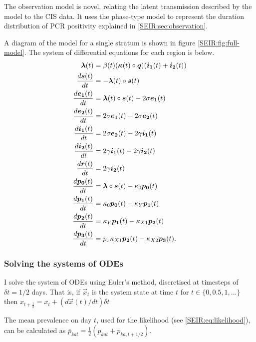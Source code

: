 \documentclass[thesis.tex]{subfiles}
\begin{document}
The observation model is novel, relating the latent transmission described by the model to the CIS data.
It uses the phase-type model to represent the duration distribution of PCR positivity explained in \cref{SEIR:sec:observation}.

A diagram of the model for a single stratum is shown in figure \cref{SEIR:fig:full-model}.
The system of differential equations for each region is below.
\begin{align}
    \label{SEIR:eq:fullODEs}
    \bm{\lambda}(t) &= \beta(t) (\bm{\kappa}(t) \circ \bm{q}) (\bm{i_1}(t) + \bm{i_2}(t)) \\
    \frac{d\bm{s}(t)}{dt} &= -\bm{\lambda}(t) \circ \bm{s}(t) \\
    \frac{d\bm{e_1}(t)}{dt} &= \bm{\lambda}(t) \circ \bm{s}(t) - 2\sigma \bm{e_1}(t) \\
    \frac{d\bm{e_2}(t)}{dt} &= 2\sigma \bm{e_1}(t) - 2\sigma \bm{e_2}(t) \\
    \frac{d\bm{i_1}(t)}{dt} &= 2\sigma \bm{e_2}(t) - 2\gamma \bm{i_1}(t) \\
    \frac{d\bm{i_2}(t)}{dt} &= 2\gamma \bm{i_1}(t) - 2\gamma \bm{i_2}(t) \\
    \frac{d\bm{r}(t)}{dt} &= 2\gamma \bm{i_2}(t) \\
    \frac{d\bm{p_0}(t)}{dt} &= \bm{\lambda} \circ \bm{s}(t) - \kappa_0 \bm{p_0}(t) \\
    \frac{d\bm{p_1}(t)}{dt} &= \kappa_0 \bm{p_0}(t) - \kappa_Y \bm{p_1}(t) \\
    \frac{d\bm{p_2}(t)}{dt} &= \kappa_Y \bm{p_1}(t) - \kappa_{X1} \bm{p_2}(t) \\
    \frac{d\bm{p_3}(t)}{dt} &= p_x \kappa_{X1} \bm{p_2}(t) - \kappa_{X2} \bm{p_3}(t).
\end{align}

\subsubsection{Solving the systems of ODEs} \label{SEIR:sec:solving-ODEs}
I solve the system of ODEs using Euler's method, discretised at timesteps of $\delta t = 1/2$ days.
That is, if $\vec{x}_t$ is the system state at time $t$ for $t \in \{ 0, 0.5, 1, \dots \}$ then $x_{t+\frac{1}{2}} = x_t + (d\vec{x}(t)/dt) \delta t$

The mean prevalence on day $t$, used for the likelihood (see \cref{SEIR:eq:likelihood}), can be calculated as $\bar{p}_{kat} = \frac{1}{2} ( p_{kat} + p_{ka,t+1/2} )$.
\end{document}
